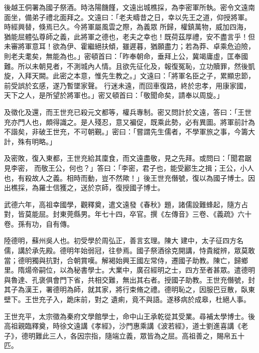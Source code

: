 \begin{pinyinscope}
 後越王侗署為國子祭酒。時洛陽饑饉，文遠出城樵採，為李密軍所執。密令文遠南面坐，備弟子禮北面拜之。文遠曰：「老夫疇昔之日，幸以先王之道，仰授將軍。時經興替，倏焉已久。今將軍屬風雲之際，為義眾
 所歸，權鎮萬物，威加四海，猶能屈體弘尊師之義，此將軍之德也，老夫之幸也！既荷茲厚禮，安不盡言乎！但未審將軍意耳！欲為伊、霍繼絕扶傾，雖遲暮，猶願盡力；若為莽、卓乘危迫險，則老夫耄矣，無能為也。」密頓首曰：「昨奉朝命，垂拜上公，冀竭庸虛，匡奉國難。所以未朝見者，不測城內人情。且欲先征化及，報復冤恥，立功贖罪，然後凱旋，入拜天闕。此密之本意，惟先生教之。」文遠曰：「將軍名臣之子，累顯忠節，前受誤於玄感，遂乃暫墜家聲。
 行迷未遠，而回車復路，終於忠孝，用康家國，天下之人，是所望於將軍也。」密又頓首曰：「敬聞命矣，請奉以周旋。」



 及徵化及還，而王世充已殺元文都等，權兵專制。密又問計於文遠，答曰：「王世充亦門人也，頗得識之。是人殘忍，意又褊促，既乘此勢，必有異圖。將軍前計為不諧矣，非破王世充，不可朝覲。」密曰：「嘗謂先生儒者，不學軍旅之事，今籌大計，殊有明略。」



 及密敗，復入東都，王世充給其廩食，而文遠盡敬，見之先拜。或問曰：「聞君踞見李密，
 而敬王公，何也？」答曰：「李密，君子也，能受酈生之揖；王公，小人也，有殺故人之義。相時而動，豈不然歟！」後王世充僭號，復以為國子博士。因出樵採，為羅士信獲之，送於京師，復授國子博士。



 武德六年，高祖幸國學，觀釋奠，遣文遠發《春秋》題，諸儒設難蜂起，隨方占對，皆莫能屈。封東莞縣男。年七十四，卒官。撰《左傳音》三卷、《義疏》六十卷。孫有功，自有傳。



 陸德明，蘇州吳人也。初受學於周弘正，善言玄理。陳大
 建中，太子征四方名儒，講於承先殿。德明年始弱冠，往參焉。國子祭酒徐克開講，恃貴縱辨，眾莫敢當；德明獨與抗對，合朝賞嘆。解褐始興王國左常侍，遷國子助教。陳亡，歸鄉里。隋煬帝嗣位，以為秘書學士。大業中，廣召經明之士，四方至者甚眾。遣德明與魯達、孔褒俱會門下省，共相交難，無出其右者。授國子助教。王世充僭號，封其子為漢王，署德明為師，就其家，將行束脩之禮。德明恥之，因服巴豆散，臥東壁下。王世充子入，跪床前，對之
 遺痢，竟不與語。遂移病於成皋，杜絕人事。



 王世充平，太宗徵為秦府文學館學士，命中山王承乾從其受業。尋補太學博士。後高祖親臨釋奠，時徐文遠講《孝經》，沙門惠乘講《波若經》，道士劉進喜講《老子》，德明難此三人，各因宗指，隨端立義，眾皆為之屈。高祖善之，賜帛五十匹。




\end{pinyinscope}

